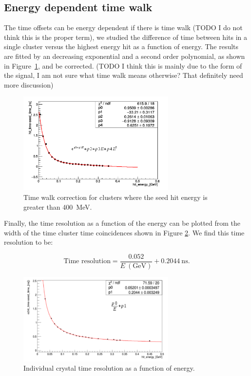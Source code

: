 \documentclass[review]{elsarticle}
\begin{document}
\subsection{Energy dependent time walk}

The time offsets can be energy dependent if there is time walk (TODO I do not 
think this is the proper term), we studied the difference of time between hits 
in a single cluster versus the highest energy hit as a function of energy. The 
results are fitted by an decreasing exponential and a second order polynomial,
as shown in Figure~\ref{TimeWalk}, and be corrected.
(TODO I think this is mainly due to the form of the signal, I am not sure what 
time walk means otherwise? That definitely need more discussion)

\begin{figure}[ht!]
\centering
\includegraphics[width=0.70\textwidth]{twalk.png}
\caption{Time walk correction for clusters where the seed hit energy is greater than 400~MeV.}
\label{TimeWalk}
\end{figure}


Finally, the time resolution as a function of the energy can be plotted from 
the width of the time cluster time coincidences shown in Figure \ref{TresoVSTime}. 
We find this time resolution to be:

\begin{equation}
\textrm{Time resolution}= \frac{0.052}{E~(\textrm{GeV})} + 0.2044~\textrm{ns}.
\label{eq}
\end{equation}


\begin{figure}[ht!]
\centering
\includegraphics[width=0.70\textwidth]{TimeResolution.png}
\caption{Individual crystal time resolution as a function of energy.}
\label{TresoVSTime}
\end{figure}
\end{document}
